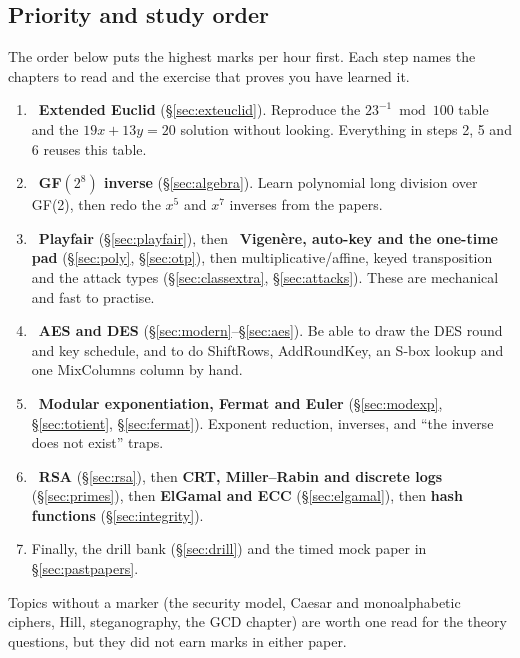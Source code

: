 \subsection{Priority and study order}
The order below puts the highest marks per hour first. Each step names the chapters to read and the exercise that proves you have learned it.
\begin{enumerate}[leftmargin=1.6em,itemsep=2pt]
\item \hothot\ \textbf{Extended Euclid} (\S\ref{sec:exteuclid}). Reproduce the $23^{-1} \bmod 100$ table and the $19x + 13y = 20$ solution without looking. Everything in steps 2, 5 and 6 reuses this table.
\item \hothot\ \textbf{GF$(2^8)$ inverse} (\S\ref{sec:algebra}). Learn polynomial long division over GF(2), then redo the $x^5$ and $x^7$ inverses from the papers.
\item \hothot\ \textbf{Playfair} (\S\ref{sec:playfair}), then \hot\ \textbf{Vigen\`ere, auto-key and the one-time pad} (\S\ref{sec:poly}, \S\ref{sec:otp}), then multiplicative/affine, keyed transposition and the attack types (\S\ref{sec:classextra}, \S\ref{sec:attacks}). These are mechanical and fast to practise.
\item \hot\ \textbf{AES and DES} (\S\ref{sec:modern}--\S\ref{sec:aes}). Be able to draw the DES round and key schedule, and to do ShiftRows, AddRoundKey, an S-box lookup and one MixColumns column by hand.
\item \hot\ \textbf{Modular exponentiation, Fermat and Euler} (\S\ref{sec:modexp}, \S\ref{sec:totient}, \S\ref{sec:fermat}). Exponent reduction, inverses, and ``the inverse does not exist'' traps.
\item \new\ \textbf{RSA} (\S\ref{sec:rsa}), then \textbf{CRT, Miller--Rabin and discrete logs} (\S\ref{sec:primes}), then \textbf{ElGamal and ECC} (\S\ref{sec:elgamal}), then \textbf{hash functions} (\S\ref{sec:integrity}).
\item Finally, the drill bank (\S\ref{sec:drill}) and the timed mock paper in \S\ref{sec:pastpapers}.
\end{enumerate}
Topics without a marker (the security model, Caesar and monoalphabetic ciphers, Hill, steganography, the GCD chapter) are worth one read for the theory questions, but they did not earn marks in either paper.
